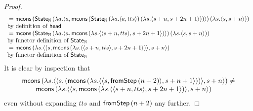 \begin{proof}
$$\begin{array}{ll}
{}=  \mathsf{mcons}\, (\mathsf{State}_{\mathbb{N}}\,(\lambda a . \langle a,   
\mathsf{mcons}\, (\mathsf{State}_{\mathbb{N}} \,(\lambda a . \langle a, tts \rangle)\, (\lambda s . \langle s + n, s + 2n + 1 \rangle))
 \rangle)\, (\lambda s. \langle s, s + n \rangle))
\\ \mbox{by definition of } \mathsf{head} \\
{}= \mathsf{mcons}\, (\mathsf{State}_{\mathbb{N}}\,(\lambda a . \langle a,   
\mathsf{mcons}\, (\lambda s . \langle \langle s + n, tts \rangle, s + 2n + 1 \rangle)
 \rangle)\, (\lambda s. \langle s, s + n \rangle)) \\
\mbox{by functor definition of } \mathsf{State}_{\mathbb{N}}  \\
{}= \mathsf{mcons}\, (\lambda s. \langle \langle s, \mathsf{mcons}\, (\lambda s . \langle \langle s + n, tts \rangle, s + 2n + 1 \rangle) \rangle, s + n \rangle) \\ 
\mbox{by functor definition of } \mathsf{State}_{\mathbb{N}} \\
\end{array} 
$$
It is clear by inspection that 
$$
\begin{array}{l}
\mathsf{mcons}\, (\lambda s. \langle \langle s, (\mathsf{mcons}\, (\lambda s. \langle \langle s, \mathsf{fromStep}\, (n + 2) \rangle, s + n + 1 \rangle)) \rangle, s + n \rangle) \neq \\
\qquad \mathsf{mcons}\, (\lambda s. \langle \langle s, \mathsf{mcons}\, (\lambda s . \langle \langle s + n, tts \rangle, s + 2n + 1 \rangle) \rangle, s + n \rangle)
\end{array} 
$$
even without expanding $tts$ and $\mathsf{fromStep}\, (n + 2)$ any further.
\end{proof}




